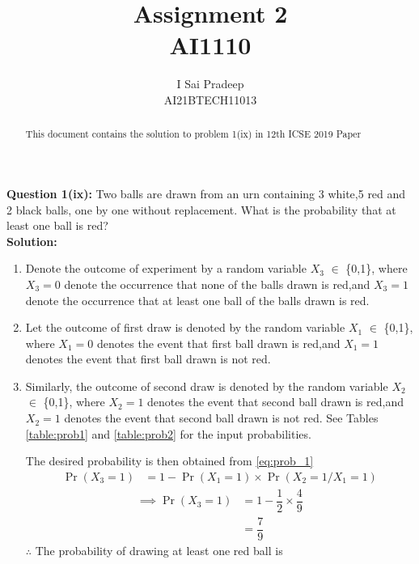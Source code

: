 \documentclass[journal,11pt,twocolumn]{IEEEtran}
\providecommand{\pr}[1]{\ensuremath{\Pr\left(#1\right)}}
\begin{document}
	\title{\huge{Assignment 2}\\AI1110}
	\author{\Large{I Sai Pradeep}\\AI21BTECH11013}
	\maketitle
	\begin{abstract}
		This document contains the solution to problem 1(ix) in 12th ICSE 2019 Paper
	\end{abstract}
	\noindent \textbf{Question 1(ix):}
	Two balls are drawn from an urn containing 3 white,5 red and 2 black balls, one by one without replacement. What is the probability that at least one ball is red?\\	
	\textbf{Solution:}
	\begin{enumerate}
		\item Denote the outcome of experiment by a random variable $X_3$ $\in$ \{0,1\}, where $X_3=0$ denote the occurrence that none of the balls drawn is red,and $X_3=1$ denote the occurrence that at least one ball of the balls drawn is red. 
		\item Let the outcome of first draw is denoted by the random variable $X_1$ $\in$ \{0,1\}, where $X_1=0$ denotes the event that first ball drawn is red,and $X_1=1$ denotes the event that first ball drawn is not red.
		\item  Similarly, the outcome of second draw is denoted by the random variable $X_2$ $\in$ \{0,1\}, where $X_2=1$ denotes the event that second ball drawn is red,and $X_2=1$ denotes the event that second ball drawn is not red. 
		See Tables 
		\eqref{table:prob1}
		and 
		\eqref{table:prob2} 
		for the input probabilities.
		\begin{table}[ht!]
			
			\vspace*{5pt}
			\caption{}
			\label{table:prob1}
		\end{table}
		\begin{table}[ht!]
			
			\vspace*{5pt}
			\caption{}
			\label{table:prob2}
		\end{table}
		The desired probability is then obtained from
		\eqref{eq:prob_1}
		\begin{align}
		\pr{X_3=1}&= 1-\pr{X_1=1} \times \pr{X_2=1/X_1 =1}
	    \label{eq:prob_1}
		\end{align}
		\begin{align}
			\implies \pr{X_3 = 1} &= 1-{{\dfrac{1}{2}} \times \dfrac{4}{9}}
			\\
			&= \dfrac{7}{9}
	    \end{align}
		$\therefore$ The probability of drawing at least one red ball is 
		
	\end{enumerate}
\end{document}
